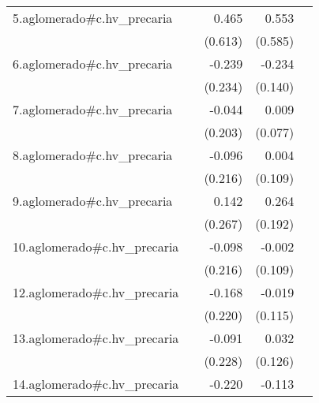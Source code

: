 {\begin{longtable}{l*{4}{D{.}{.}{-1}}}
\addlinespace
5.aglomerado#c.hv\_precaria&                     &       0.465         &       0.553         &                     \\
            &                     &     (0.613)         &     (0.585)         &                     \\
\addlinespace
6.aglomerado#c.hv\_precaria&                     &      -0.239         &      -0.234         &                     \\
            &                     &     (0.234)         &     (0.140)         &                     \\
\addlinespace
7.aglomerado#c.hv\_precaria&                     &      -0.044         &       0.009         &                     \\
            &                     &     (0.203)         &     (0.077)         &                     \\
\addlinespace
8.aglomerado#c.hv\_precaria&                     &      -0.096         &       0.004         &                     \\
            &                     &     (0.216)         &     (0.109)         &                     \\
\addlinespace
9.aglomerado#c.hv\_precaria&                     &       0.142         &       0.264         &                     \\
            &                     &     (0.267)         &     (0.192)         &                     \\
\addlinespace
10.aglomerado#c.hv\_precaria&                     &      -0.098         &      -0.002         &                     \\
            &                     &     (0.216)         &     (0.109)         &                     \\
\addlinespace
12.aglomerado#c.hv\_precaria&                     &      -0.168         &      -0.019         &                     \\
            &                     &     (0.220)         &     (0.115)         &                     \\
\addlinespace
13.aglomerado#c.hv\_precaria&                     &      -0.091         &       0.032         &                     \\
            &                     &     (0.228)         &     (0.126)         &                     \\
\addlinespace
14.aglomerado#c.hv\_precaria&                     &      -0.220         &      -0.113         &                     \\

\end{longtable}}
